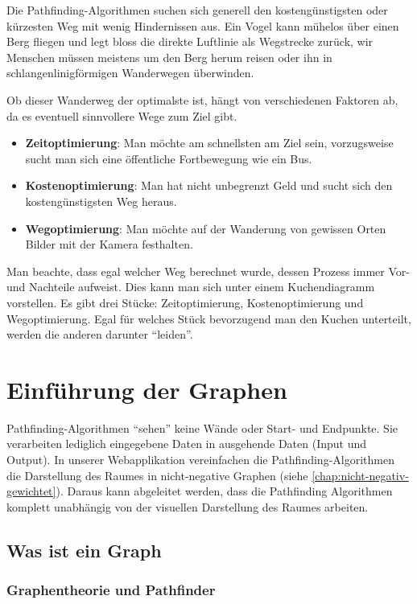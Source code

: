 Die Pathfinding-Algorithmen suchen sich generell den kostengünstigsten
oder kürzesten Weg mit wenig Hindernissen aus. Ein Vogel kann mühelos
über einen Berg fliegen und legt bloss die direkte Luftlinie als
Wegstrecke zurück, wir Menschen müssen meistens um den Berg herum reisen
oder ihn in schlangenlinigförmigen Wanderwegen überwinden.

Ob dieser Wanderweg der optimalste ist, hängt von verschiedenen Faktoren
ab, da es eventuell sinnvollere Wege zum Ziel gibt.

\begin{itemize}
\item
  \textbf{Zeitoptimierung}: Man möchte am schnellsten am Ziel sein, vorzugsweise sucht man sich
  eine öffentliche Fortbewegung wie ein Bus.
\item
  \textbf{Kostenoptimierung}: Man hat nicht unbegrenzt Geld und sucht sich den kostengünstigsten Weg
  heraus.
\item
  \textbf{Wegoptimierung}: Man möchte auf der Wanderung von gewissen Orten Bilder mit der Kamera
  festhalten.
\end{itemize}

Man beachte, dass egal welcher Weg berechnet wurde, dessen Prozess immer Vor-
und Nachteile aufweist. Dies kann man sich unter einem Kuchendiagramm vorstellen.
Es gibt drei Stücke: Zeitoptimierung, Kostenoptimierung und
Wegoptimierung. Egal für welches Stück bevorzugend man den Kuchen
unterteilt, werden die anderen darunter ``leiden''.
\cite[Wikipedia, 2018]{wikipath}

\section{Einführung der Graphen}

Pathfinding-Algorithmen ``sehen'' keine Wände oder Start- und
Endpunkte. Sie verarbeiten lediglich eingegebene Daten in ausgehende
Daten (Input und Output). In unserer Webapplikation vereinfachen die
Pathfinding-Algorithmen die Darstellung des Raumes in nicht-negative
 Graphen (siehe \autoref{chap:nicht-negativ-gewichtet}). Daraus kann abgeleitet
werden, dass die Pathfinding Algorithmen komplett unabhängig von der
visuellen Darstellung des Raumes arbeiten.
\cite[Andreas Hofmann, 2013]{pfbsc}

\subsection{Was ist ein Graph}
\subsubsection{Graphentheorie und Pathfinder}

